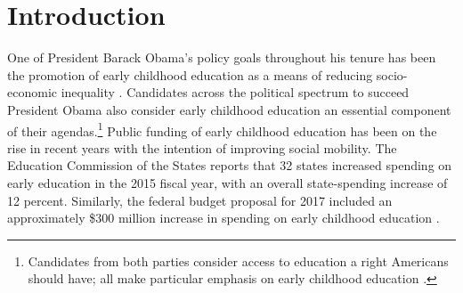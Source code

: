 \singlespacing
\tableofcontents
\listoffigures
\listoftables

\section{Introduction}

\noindent One of President Barack Obama's policy goals throughout his tenure has been the promotion of early childhood education as a means of reducing socio-economic inequality \citep{Bajaj_Labaton_2009_ObamaRiskAssets,White_House_2014_Econ_of_EC_Investments,White_House_2014_Fact_Sheet_Press}. Candidates across the political spectrum to succeed President Obama also consider early childhood education an essential component of their agendas.\footnote{Candidates from both parties consider access to education a right Americans should have; all make particular emphasis on early childhood education \citep{Hillary-for-Am_2016_Universal-Preschool,On-the-Issues_2016_Sanders-on-Families,On-the-Issues_2016_Cruz-on-Education}.} Public funding of early childhood education has been on the rise in recent years with the intention of improving social mobility. The Education Commission of the States reports that 32 states increased spending on early education in the 2015 fiscal year, with an overall state-spending increase of 12 percent. Similarly, the federal budget proposal for 2017 included an approximately \$300 million increase in spending on early childhood education \citep{US-Gov_2016_Budget,Parker-etal_2016_50-State-Review,Smith_2016_Early-Learning-Budget}.\\

